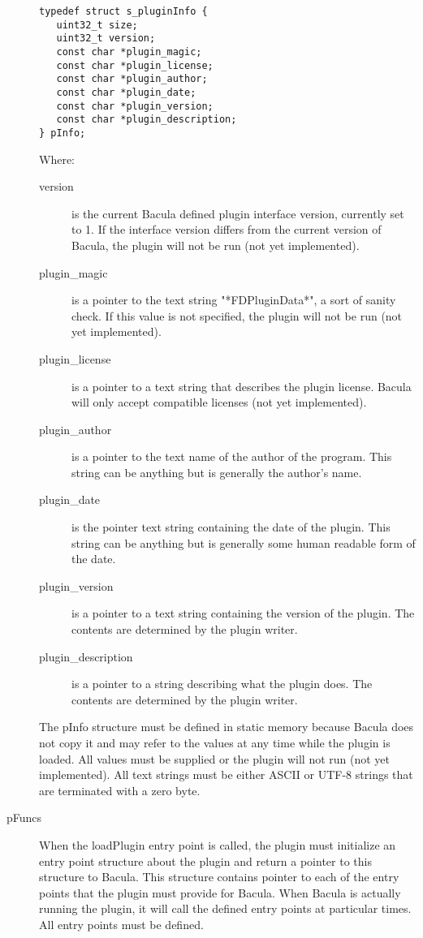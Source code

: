 \begin{description}
\begin{verbatim}
typedef struct s_pluginInfo {
   uint32_t size;
   uint32_t version;
   const char *plugin_magic;
   const char *plugin_license;
   const char *plugin_author;
   const char *plugin_date;
   const char *plugin_version;
   const char *plugin_description;
} pInfo;
\end{verbatim}

Where:
 \begin{description}
 \item [version] is the current Bacula defined plugin interface version, currently
   set to 1. If the interface version differs from the current version of 
   Bacula, the plugin will not be run (not yet implemented).
 \item [plugin\_magic] is a pointer to the text string "*FDPluginData*", a
   sort of sanity check.  If this value is not specified, the plugin
   will not be run (not yet implemented).
 \item [plugin\_license] is a pointer to a text string that describes the
   plugin license. Bacula will only accept compatible licenses (not yet
   implemented).
 \item [plugin\_author] is a pointer to the text name of the author of the program.
   This string can be anything but is generally the author's name.
 \item [plugin\_date] is the pointer text string containing the date of the plugin.
   This string can be anything but is generally some human readable form of 
   the date.
 \item [plugin\_version] is a pointer to a text string containing the version of
   the plugin.  The contents are determined by the plugin writer.
 \item [plugin\_description] is a pointer to a string describing what the
   plugin does. The contents are determined by the plugin writer.
 \end{description}

The pInfo structure must be defined in static memory because Bacula does not
copy it and may refer to the values at any time while the plugin is
loaded. All values must be supplied or the plugin will not run (not yet
implemented).  All text strings must be either ASCII or UTF-8 strings that
are terminated with a zero byte.

\item [pFuncs]
When the loadPlugin entry point is called, the plugin must initialize
an entry point structure about the plugin and return a pointer to
this structure to Bacula. This structure contains pointer to each
of the entry points that the plugin must provide for Bacula. When
Bacula is actually running the plugin, it will call the defined
entry points at particular times.  All entry points must be defined.


\end{description}
